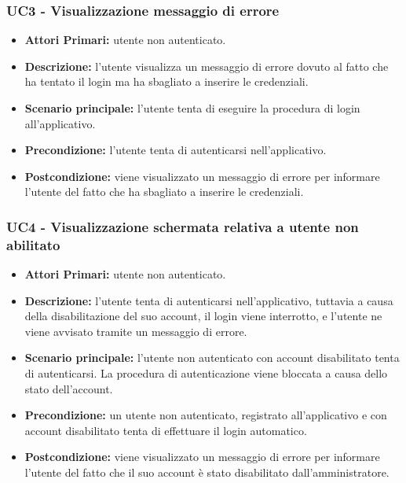 \subsubsection{ UC3 - Visualizzazione messaggio di errore}
\begin{itemize}
	\item\textbf{Attori Primari:} utente non autenticato.
	\item\textbf{Descrizione:} l'utente visualizza un messaggio di errore dovuto al fatto che ha tentato il login ma ha sbagliato a inserire le credenziali.
	\item\textbf{Scenario principale:} l’utente tenta di eseguire la procedura di login all'applicativo.
	\item\textbf{Precondizione:} l'utente tenta di autenticarsi nell'applicativo.
	\item\textbf{Postcondizione:} viene visualizzato un messaggio di errore per informare l'utente del fatto che ha sbagliato a inserire le credenziali.
\end{itemize}
\subsubsection{ UC4 - Visualizzazione schermata relativa a utente non abilitato}
\begin{itemize}
	\item\textbf{Attori Primari:} utente non autenticato.
	\item\textbf{Descrizione:} l'utente tenta di autenticarsi nell'applicativo, tuttavia a causa della disabilitazione del suo account, il login viene interrotto, e
	l'utente ne viene avvisato tramite un messaggio di errore.
	\item\textbf{Scenario principale:} l’utente non autenticato con account disabilitato tenta di autenticarsi. 
	La procedura di autenticazione viene bloccata a causa dello stato dell'account.
	\item\textbf{Precondizione:} un utente non autenticato, registrato all'applicativo e con account disabilitato tenta di effettuare il login automatico. 
	\item\textbf{Postcondizione:} viene visualizzato un messaggio di errore per informare l'utente del fatto che il suo account è stato disabilitato dall'amministratore.
\end{itemize}

